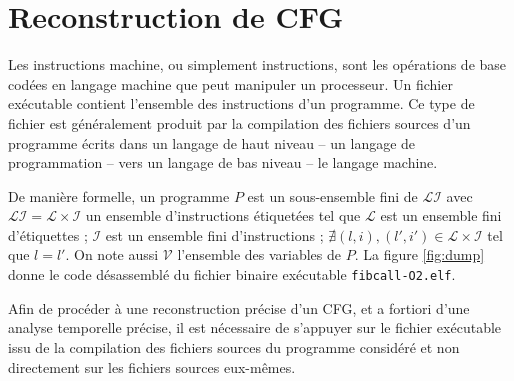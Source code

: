 \section{Reconstruction de CFG}
\label{sec:reconstruction}
  

    Les instructions machine, ou simplement instructions, sont les opérations de
    base codées en langage machine que peut manipuler un processeur. Un fichier
    exécutable contient l'ensemble des instructions d'un programme. Ce type de
    fichier est généralement produit par la compilation des fichiers sources
    d'un programme écrits dans un langage de haut niveau -- un langage de
    programmation -- vers un langage de bas niveau -- le langage machine.
    
    De manière formelle, un programme $P$ est un sous-ensemble fini de
    $\mathcal{LI}$ avec $\mathcal{LI} = \mathcal{L} \times \mathcal{I}$ un
    ensemble d'instructions étiquetées tel que $\mathcal{L}$ est un ensemble
    fini d'étiquettes ; $\mathcal{I}$ est un ensemble fini d'instructions ;
    $\nexists (l,i),(l',i') \in \mathcal{L} \times \mathcal{I}$ tel que $l =
    l'$.  On note aussi $\mathcal{V}$ l'ensemble des variables de $P$. La figure
    \ref{fig:dump} donne le code désassemblé du fichier binaire exécutable
    \texttt{fibcall-O2.elf}.

    \vspace{1em}
    
    Afin de procéder à une reconstruction précise d'un CFG, et a fortiori d'une
    analyse temporelle précise, il est nécessaire de s'appuyer sur le fichier
    exécutable issu de la compilation des fichiers sources du programme
    considéré et non directement sur les fichiers sources eux-mêmes.

    \vspace{1em}
    
